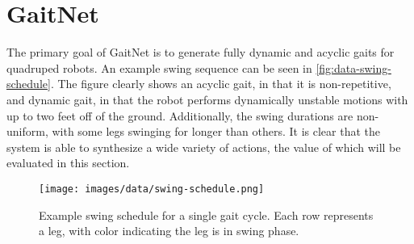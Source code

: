 \section{GaitNet}

The primary goal of GaitNet is to generate fully dynamic and acyclic
gaits for quadruped robots. An example swing sequence can be seen in
\autoref{fig:data-swing-schedule}. The figure clearly shows an acyclic
gait, in that it is non-repetitive, and dynamic gait, in that the robot
performs dynamically unstable motions with up to two feet off of the ground.
Additionally, the swing durations are non-uniform, with some legs
swinging for longer than others. It is clear that the system is able to
synthesize a wide variety of actions, the value of which will be evaluated
in this section.

\begin{figure}[H]
  \centering
  \texttt{[image: images/data/swing-schedule.png]}
  \caption{Example swing schedule for a single gait cycle. Each row
  represents a leg, with color indicating the leg is in swing phase.}
  \label{fig:data-swing-schedule}
\end{figure}
